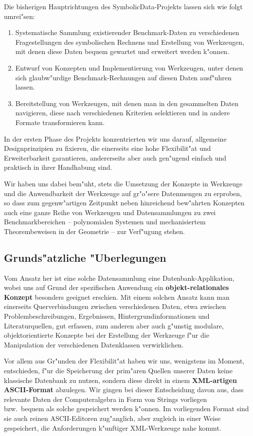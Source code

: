\documentclass{article}
\newcommand{\SD}{{\sc Symbolic\-Data}}
\begin{document}
Die bisherigen Hauptrichtungen des \SD-Projekts lassen sich wie folgt
umrei"sen:
\begin{enumerate}
\item Systematische Sammlung existierender Benchmark-Daten zu
verschiedenen Fragestellungen des symbolischen Rechnens und Erstellung
von Werkzeugen, mit denen diese Daten bequem gewartet und erweitert
werden k"onnen.
\item Entwurf von Konzepten und Implementierung von Werkzeugen, unter
denen sich glaubw"urdige Benchmark-Rechnungen auf diesen Daten
ausf"uhren lassen.
\item Bereitstellung von Werkzeugen, mit denen man in den gesammelten
Daten navigieren, diese nach verschiedenen Kriterien selektieren und
in andere Formate transformieren kann.
\end{enumerate}

In der ersten Phase des Projekts konzentrierten wir uns darauf,
allgemeine Designprinzipien zu fixieren, die einerseits eine hohe
Flexibilit"at und Erweiterbarkeit garantieren, andererseits aber auch
gen"ugend einfach und praktisch in ihrer Handhabung sind.

Wir haben uns dabei bem"uht, stets die Umsetzung der Konzepte in
Werkzeuge und die Anwendbarkeit der Werkzeuge auf gr"o"sere
Datenmengen zu erproben, so dass zum gegenw"artigen Zeitpunkt neben
hinreichend bew"ahrten Konzepten auch eine ganze Reihe von
Werkzeugen und Datensammlungen zu zwei Benchmarkbereichen --
polynomialen Systemen und mechanisiertem Theorembeweisen in der
Geometrie -- zur Verf"ugung stehen. 

\subsection*{Grunds"atzliche "Uberlegungen}

Vom Ansatz her ist eine solche Datensammlung eine
Datenbank-Applikation, wobei uns auf Grund der spezifischen Anwendung
ein {\bf objekt-relationales Konzept} besonders geeignet erschien.
Mit einem solchen Ansatz kann man einerseits Querverbindungen zwischen
verschiedenen Daten, etwa zwischen Problembeschreibungen, Ergebnissen,
Hintergrundinformationen und Literaturquellen, gut erfassen, zum
anderen aber auch g"unstig modulare, objektorientierte Konzepte bei
der Erstellung der Werkzeuge f"ur die Manipulation der verschiedenen
Datenklassen verwirklichen.

Vor allem aus Gr"unden der Flexibilit"at haben wir uns, wenigstens im
Moment, entschieden, f"ur die Speicherung der prim"aren Quellen
unserer Daten keine klassische Datenbank zu nutzen, sondern diese
direkt in einem {\bf XML-artigen ASCII-Format} abzulegen. Wir gingen
bei dieser Entscheidung davon aus, dass relevante Daten der
Computeralgebra in Form von Strings vorliegen bzw.\ bequem als solche
gespeichert werden k"onnen.  Im vorliegenden Format sind sie auch
reinen ASCII-Editoren zug"anglich, aber zugleich in einer Weise
gespeichert, die Anforderungen k"unftiger XML-Werkzeuge nahe kommt.
\end{document}
